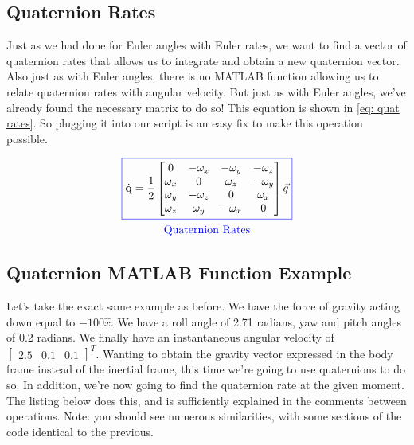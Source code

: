 \documentclass[12pt]{report}
\begin{document}
\subsection{Quaternion Rates}\label{sec: quaternion rates}

Just as we had done for \gls{Euler angles} with \gls{Euler rates}, we want to find a vector of \gls{quaternion} rates that allows us to integrate and obtain a new \gls{quaternion} vector. Also just as with \gls{Euler angles}, there is no MATLAB function allowing us to relate \gls{quaternion} rates with angular velocity. But just as with \gls{Euler angles}, we've already found the necessary matrix to do so! This equation is shown in \eqref{eq: quat rates}. So plugging it into our script is an easy fix to make this operation possible.

\begin{gather}\label{eq: quat rates}
    \color{blue}\boxed{\color{black}\dot{\textbf{q}}=\frac{1}{2}\begin{bmatrix}
        0&-\omega_x&-\omega_y&-\omega_z\\
        \omega_x&0&\omega_z&-\omega_y\\
        \omega_y&-\omega_z&0&\omega_x\\
        \omega_z&\omega_y&-\omega_x&0
    \end{bmatrix}\vec{q}}
    \\\mathrm{\color{blue}Quaternion \ Rates}
\end{gather}

\subsection{Quaternion MATLAB Function Example}

Let's take the exact same example as before. We have the force of gravity acting down equal to $-100\hat{x}$. We have a roll angle of 2.71 radians, yaw and pitch angles of 0.2 radians. We finally have an instantaneous angular velocity of $\begin{bmatrix}
    2.5&0.1&0.1
\end{bmatrix}^T$. Wanting to obtain the gravity vector expressed in the \gls{body frame} instead of the \gls{inertial frame}, this time we're going to use \glspl{quaternion} to do so. In addition, we're now going to find the \gls{quaternion} rate at the given moment. The listing below does this, and is sufficiently explained in the comments between operations. Note: you should see numerous similarities, with some sections of the code identical to the previous. 
\end{document}
